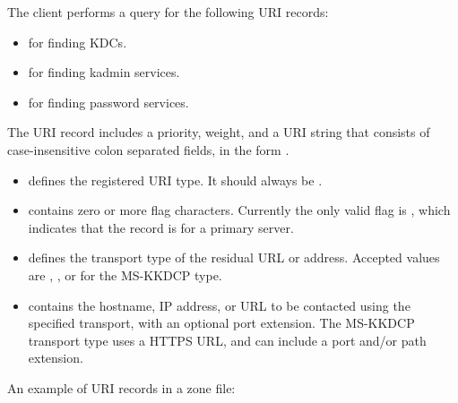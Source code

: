 \documentclass[letterpaper,10pt,english]{sphinxmanual}
\begin{document}
The client performs a query for the following URI records:
\begin{itemize}
\item {} 
 for finding KDCs.

\item {} 
 for finding kadmin services.

\item {} 
 for finding password services.

\end{itemize}

The URI record includes a priority, weight, and a URI string that
consists of case-insensitive colon separated fields, in the form
.
\begin{itemize}
\item {} 
 defines the registered URI type.  It should always be
.

\item {} 
 contains zero or more flag characters.  Currently the only
valid flag is , which indicates that the record is for a
primary server.

\item {} 
 defines the transport type of the residual URL or
address.  Accepted values are , , or  for the
MS-KKDCP type.

\item {} 
 contains the hostname, IP address, or URL to be
contacted using the specified transport, with an optional port
extension.  The MS-KKDCP transport type uses a HTTPS URL, and can
include a port and/or path extension.

\end{itemize}

An example of URI records in a zone file:

%
\begin{sphinxVerbatim}[commandchars=\\\{\}]
      
                           
                           
                           
\end{sphinxVerbatim}
\end{document}
